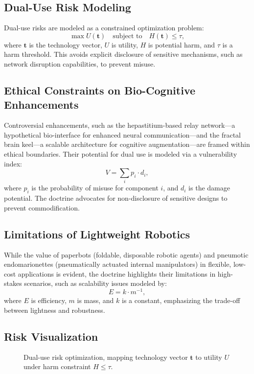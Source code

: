 \documentclass[11pt,oneside]{memoir}
\theoremstyle{plain}
\newcommand{\R}{\mathbb{R}}
\begin{document}
\subsection{Dual-Use Risk Modeling}
Dual-use risks are modeled as a constrained optimization problem:
\begin{equation}
    \max U(\mathbf{t}) \quad \text{subject to} \quad H(\mathbf{t}) \leq \tau,
    \label{eq:dual_use}
\end{equation}
where \(\mathbf{t}\) is the technology vector, \(U\) is utility, \(H\) is potential harm, and \(\tau\) is a harm threshold. This avoids explicit disclosure of sensitive mechanisms, such as network disruption capabilities, to prevent misuse.

\subsection{Ethical Constraints on Bio-Cognitive Enhancements}
Controversial enhancements, such as the hepastitium-based relay network—a hypothetical bio-interface for enhanced neural communication—and the fractal brain keel—a scalable architecture for cognitive augmentation—are framed within ethical boundaries. Their potential for dual use is modeled via a vulnerability index:
\begin{equation}
    V = \sum_{i} p_i \cdot d_i,
\end{equation}
where \(p_i\) is the probability of misuse for component \(i\), and \(d_i\) is the damage potential. The doctrine advocates for non-disclosure of sensitive designs to prevent commodification.

\subsection{Limitations of Lightweight Robotics}
While the value of paperbots (foldable, disposable robotic agents) and pneumotic endomarionettes (pneumatically actuated internal manipulators) in flexible, low-cost applications is evident, the doctrine highlights their limitations in high-stakes scenarios, such as scalability issues modeled by:
\begin{equation}
    E = k \cdot m^{-1},
\end{equation}
where \(E\) is efficiency, \(m\) is mass, and \(k\) is a constant, emphasizing the trade-off between lightness and robustness.

\subsection{Risk Visualization}
\begin{figure}[h]
    \centering
    \caption{Dual-use risk optimization, mapping technology vector \(\mathbf{t}\) to utility \(U\) under harm constraint \(H \leq \tau\).}
    \label{fig:dual_use_risk}
\end{figure}
\end{document}

